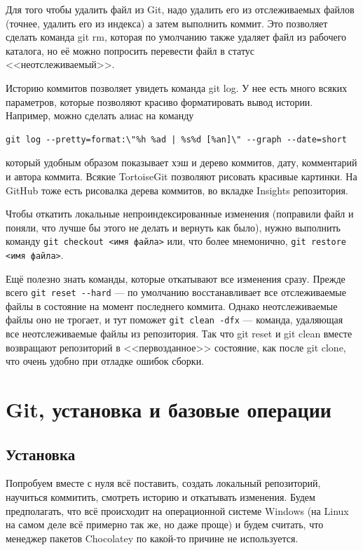 \documentclass{../../text-style}
\begin{document}
Для того чтобы удалить файл из Git, надо удалить его из отслеживаемых файлов (точнее, удалить его из индекса) а затем выполнить коммит. Это позволяет сделать команда git rm, которая по умолчанию также удаляет файл из рабочего каталога, но её можно попросить перевести файл в статус <<неотслеживаемый>>.

Историю коммитов позволяет увидеть команда git log. У нее есть много всяких параметров, которые позволяют красиво форматировать вывод истории. Например, можно сделать алиас на команду 

\begin{verbatim}
git log --pretty=format:\"%h %ad | %s%d [%an]\" --graph --date=short
\end{verbatim}

который удобным образом показывает хэш и дерево коммитов, дату, комментарий и автора коммита. Всякие TortoiseGit позволяют рисовать красивые картинки. На GitHub тоже есть рисовалка дерева коммитов, во вкладке Insights репозитория.

Чтобы откатить локальные непроиндексированные изменения (поправили файл и поняли, что лучше бы этого не делать и вернуть как было), нужно выполнить команду \verb|git checkout <имя файла>| или, что более мнемонично, \verb|git restore <имя файла>|.

Ещё полезно знать команды, которые откатывают все изменения сразу. Прежде всего \verb|git reset --hard| --- по умолчанию восстанавливает все отслеживаемые файлы в состояние на момент последнего коммита. Однако неотслеживаемые файлы оно не трогает, и тут поможет \verb|git clean -dfx| --- команда, удаляющая все неотслеживаемые файлы из репозитория. Так что git reset и git clean вместе возвращают репозиторий в <<первозданное>> состояние, как после git clone, что очень удобно при отладке ошибок сборки.

\section{Git, установка и базовые операции}

\subsection{Установка}

Попробуем вместе с нуля всё поставить, создать локальный репозиторий, научиться коммитить, смотреть историю и откатывать изменения. Будем предполагать, что всё происходит на операционной системе Windows (на Linux на самом деле всё примерно так же, но даже проще) и будем считать, что менеджер пакетов Chocolatey по какой-то причине не используется.
\end{document}
